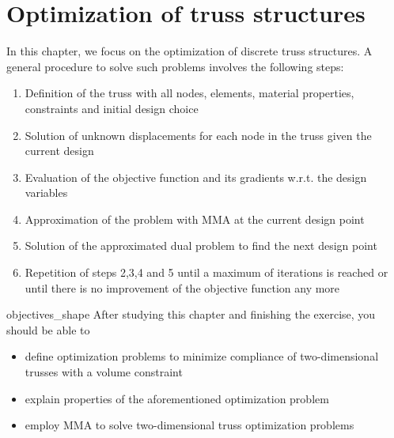 \chapter{Optimization of truss structures}
In this chapter, we focus on the optimization of discrete truss structures. A general procedure to solve such problems involves the following steps:
\begin{enumerate}
    \item Definition of the truss with all nodes, elements, material properties, constraints and initial design choice
    \item Solution of unknown displacements for each node in the truss given the current design
    \item Evaluation of the objective function and its gradients w.r.t. the design variables
    \item Approximation of the problem with MMA at the current design point
    \item Solution of the approximated dual problem to find the next design point
    \item Repetition of steps 2,3,4 and 5 until a maximum of iterations is reached or until there is no improvement of the objective function any more
\end{enumerate}


\begin{objectives}{}{objectives_shape}
After studying this chapter and finishing the exercise, you should be able to 
\begin{itemize}[label=$\dots$]
    \item define optimization problems to minimize compliance of two-dimensional trusses with a volume constraint
    \item explain properties of the aforementioned optimization problem
    \item employ MMA to solve two-dimensional truss optimization problems
\end{itemize}
\end{objectives}

